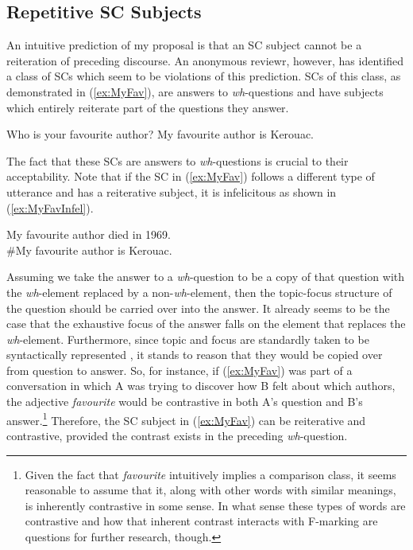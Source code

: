 \documentclass[
]{RCL}
\begin{document}
\subsection{Repetitive SC Subjects}
An intuitive prediction of my proposal is that an SC subject cannot be a reiteration of preceding discourse.
An anonymous reviewr, however, has identified a class of SCs which seem to be violations of this prediction.
SCs of this class, as demonstrated in (\ref{ex:MyFav}), are answers to \textit{wh}-questions and have subjects which entirely reiterate part of the questions they answer.
\begin{exe}
	\ex\label{ex:MyFav}
	\begin{xlist}
		 Who is your favourite author?
		 My favourite author is Kerouac.
	\end{xlist}
\end{exe}
The fact that these SCs are answers to \textit{wh}-questions is crucial to their acceptability.
Note that if the SC in (\ref{ex:MyFav}) follows a different type of utterance and has a reiterative subject, it is infelicitous as shown in (\ref{ex:MyFavInfel}).
\begin{exe}
	\ex\label{ex:MyFavInfel} My favourite author died in 1969.\\
	\#My favourite author is Kerouac.
\end{exe}
Assuming we take the answer to a \textit{wh}-question to be a copy of that question with the \textit{wh}-element replaced by a non-\textit{wh}-element, then the topic-focus structure of the question should be carried over into the answer.
It already seems to be the case that the exhaustive focus of the answer falls on the element that replaces the \textit{wh}-element.
Furthermore, since topic and focus are standardly taken to be syntactically represented \citep{rizzi1997fine}, it stands to reason that they would be copied over from question to answer.
So, for instance, if (\ref{ex:MyFav}) was part of a conversation in which A was trying to discover how B felt about which authors, the adjective \textit{favourite} would be contrastive in both A's question and B's answer.\footnote{
	Given the fact that \textit{favourite} intuitively implies a comparison class, it seems reasonable to assume that it, along with other words with similar meanings, is inherently contrastive in some sense.
	In what sense these types of words are contrastive and how that inherent contrast interacts with F-marking are questions for further research, though.
}
Therefore, the SC subject in (\ref{ex:MyFav}) can be reiterative and contrastive, provided the contrast exists in the preceding \textit{wh}-question.
\end{document}
